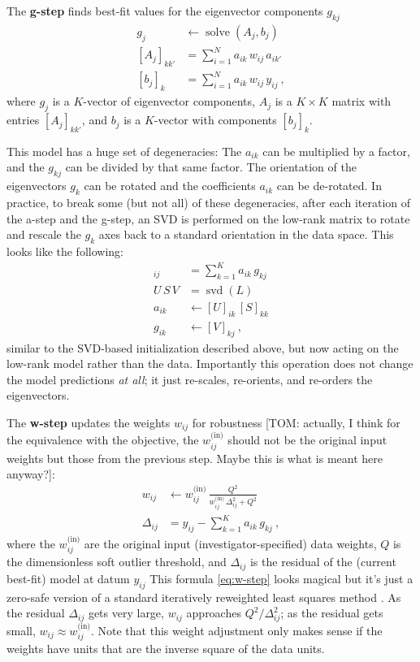 \documentclass{article}
\DeclareMathOperator{\solve}{solve}
\DeclareMathOperator{\svd}{svd}
\begin{document}
The \textbf{g-step} finds best-fit values for the eigenvector components $g_{kj}$
\begin{align}
    g_j &\leftarrow \solve(A_j, b_j) \label{eq:g-step} \\
    [A_j]_{kk'} &= \sum_{i=1}^N a_{ik}\,w_{ij}\,a_{ik'} \\
    [b_j]_k     &= \sum_{i=1}^N a_{ik}\,w_{ij}\,y_{ij} ~,
\end{align}
where $g_j$ is a $K$-vector of eigenvector components,
$A_j$ is a $K\times K$ matrix with entries $[A_j]_{kk'}$,
and $b_j$ is a $K$-vector with components $[b_j]_k$.

This model has a huge set of degeneracies:
The $a_{ik}$ can be multiplied by a factor, and the $g_{kj}$ can be divided by that same factor.
The orientation of the eigenvectors $g_k$ can be rotated and the coefficients $a_{ik}$ can be de-rotated.
In practice, to break some (but not all) of these degeneracies, after each iteration of the a-step and the g-step,
an SVD is performed on the low-rank matrix
to rotate and rescale the $g_k$ axes back to a standard orientation in the data space.
This looks like the following:
\begin{align}
    [L]_{ij} &= \sum_{k=1}^K a_{ik}\,g_{kj} \\
    U\,S\,V &= \svd(L) \\
    a_{ik} &\leftarrow [U]_{ik}\,[S]_{kk} \\
    g_{ik} &\leftarrow [V]_{kj} ~,
\end{align}
similar to the SVD-based initialization described above, but now acting on the low-rank model rather than the data.
Importantly this operation does not change the model predictions \emph{at all}; it just re-scales, re-orients, and re-orders the eigenvectors.

The \textbf{w-step} updates the weights $w_{ij}$ for robustness [TOM: actually, I think for the equivalence with the objective, the $w^\text{(in)}_{ij}$ should not be the original input weights but those from the previous step. Maybe this is what is meant here anyway?]:
\begin{align}
    w_{ij} &\leftarrow w^\text{(in)}_{ij}\,\frac{Q^2}{w^\text{(in)}_{ij}\,\Delta_{ij}^2 + Q^2} \label{eq:w-step} \\
    \Delta_{ij} &= y_{ij} - \sum_{k=1}^K a_{ik}\,g_{kj} ~,
\end{align}
where the $w^\text{(in)}_{ij}$ are the original input (investigator-specified) data weights,
$Q$ is the dimensionless soft outlier threshold,
and $\Delta_{ij}$ is the residual of the (current best-fit) model at datum $y_{ij}$
This formula \eqref{eq:w-step} looks magical but it's just a zero-safe version of a standard iteratively reweighted least squares method \cite{irls}.
As the residual $\Delta_{ij}$ gets very large, $w_{ij}$ approaches $Q^2 / \Delta_{ij}^2$;
as the residual gets small, $w_{ij}\approx w^\text{(in)}_{ij}$.
Note that this weight adjustment only makes sense if the weights have units that are the inverse square of the data units.
\end{document}
